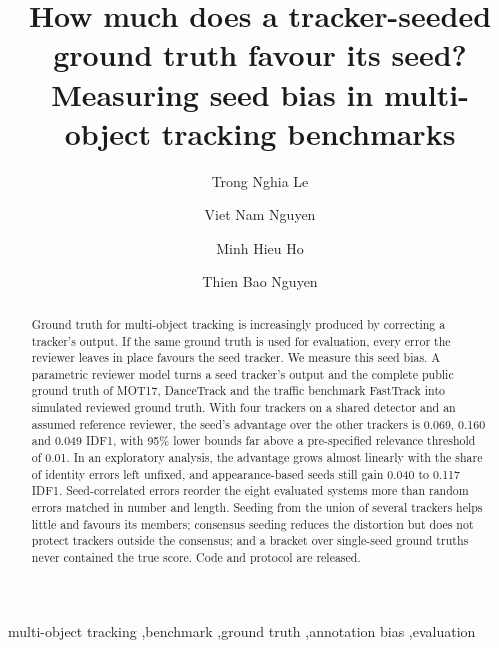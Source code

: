 \documentclass[final,times,twocolumn]{elsarticle}
\begin{document}
\begin{frontmatter}

\title{How much does a tracker-seeded ground truth favour its seed?\\
Measuring seed bias in multi-object tracking benchmarks}

\author[ueh]{Trong Nghia Le}
\author[ueh]{Viet Nam Nguyen}
\author[ueh]{Minh Hieu Ho}
\author[ueh]{Thien Bao Nguyen}
\address[ueh]{Institute of Intelligent and Interactive Technologies (3ITech), College of Technology and Design,
University of Economics Ho Chi Minh City (UEH), 279 Nguyen Tri Phuong, Dien Hong Ward, Ho Chi Minh City,
Vietnam}

\begin{abstract}
Ground truth for multi-object tracking is increasingly produced by correcting a tracker's output. If the
same ground truth is used for evaluation, every error the reviewer leaves in place favours the seed
tracker. We measure this seed bias. A parametric reviewer model turns a seed tracker's output and the
complete public ground truth of MOT17, DanceTrack and the traffic benchmark FastTrack into simulated
reviewed ground truth. With four trackers on a shared detector and an assumed reference reviewer, the
seed's advantage over the other trackers is 0.069, 0.160 and 0.049 IDF1, with 95\% lower bounds far above
a pre-specified relevance threshold of 0.01. In an exploratory analysis, the advantage grows almost
linearly with the share of identity errors left unfixed, and appearance-based seeds still gain 0.040 to
0.117 IDF1. Seed-correlated errors reorder the eight evaluated systems more than random
errors matched in number and length. Seeding from the union of several trackers helps little
and favours its members; consensus seeding reduces the distortion but does not protect trackers outside
the consensus; and a bracket over single-seed ground truths never contained the true score. Code and protocol are released.
\end{abstract}

\begin{keyword}
multi-object tracking \sep benchmark \sep ground truth \sep annotation bias \sep evaluation
\end{keyword}

\end{frontmatter}
\end{document}
